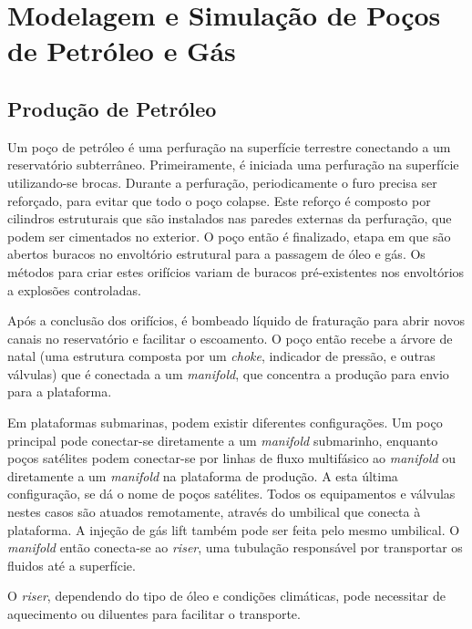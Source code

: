 

\chapter{Modelagem e Simulação de Poços de Petróleo e Gás} \label{chap:2}



\section{Produção de Petróleo}

Um poço de petróleo é uma perfuração na superfície terrestre conectando a um reservatório subterrâneo. 
%
Primeiramente, é iniciada uma perfuração na superfície utilizando-se brocas. 
%
Durante a perfuração, periodicamente o furo precisa ser reforçado, para evitar que todo o poço colapse. 
%
Este reforço é composto por cilindros estruturais que são instalados nas paredes externas da perfuração, que podem ser cimentados no exterior\cite{gasProdHand}.
%
O poço então é finalizado, etapa em que são abertos buracos no envoltório estrutural para a passagem de óleo e gás. 
%
Os métodos para criar estes orifícios variam de buracos pré-existentes nos envoltórios a explosões controladas.
%


Após a conclusão dos orifícios, é bombeado líquido de fraturação para abrir novos canais no reservatório e facilitar o escoamento.
%
O poço então recebe a árvore de natal (uma estrutura composta por um \textit{choke}, indicador de pressão, e outras válvulas) que é conectada a um \textit{manifold}, que concentra a produção para envio para a plataforma.
%

Em plataformas submarinas, podem existir diferentes configurações. Um poço principal pode conectar-se diretamente a um \textit{manifold} submarinho, enquanto poços satélites podem conectar-se por linhas de fluxo multifásico ao \textit{manifold} ou diretamente a um \textit{manifold} na plataforma de produção.
%
A esta última configuração, se dá o nome de poços satélites. Todos os equipamentos e válvulas nestes casos são atuados remotamente, através do umbilical que conecta à plataforma. A injeção de gás lift também pode ser feita pelo mesmo umbilical.
%
O \textit{manifold} então conecta-se ao \textit{riser}, uma tubulação responsável por transportar os fluidos até a superfície.
%


O \textit{riser}, dependendo do tipo de óleo e condições climáticas, pode necessitar de aquecimento ou diluentes para facilitar o transporte.
%


